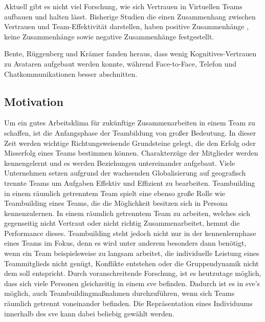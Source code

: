 \documentclass[a4paper,11pt]{article}%
\renewcommand{\\}{\vspace*{0.5\baselineskip} \newline}
\begin{document}
	Aktuell gibt es nicht viel Forschung, wie sich Vertrauen in Virtuellen Teams aufbauen und halten lässt. \citep[p.8-23]{duarte2006mastering} 
Bisherige Studien die einen Zusammenhang zwischen Vertrauen und Team-Effektivität darstellen, haben positive Zusammenhänge \citep{davis2000trusted}, keine Zusammenhänge \citep{hertel2004managing} sowie negative Zusammenhänge \citep{dirks1999effects} festgestellt. \\

Bente, Rüggenberg und Krämer fanden heraus, dass wenig Kognitives-Vertrauen zu Avataren aufgebaut werden konnte, während Face-to-Face, Telefon und Chatkommunikationen besser abschnitten. \citep[p.54-59]{bente2004social}
	
		\subsection{Motivation}
	Um ein gutes Arbeitsklima für zukünftige Zusammenarbeiten in einem Team zu schaffen, ist die Anfangsphase der Teambildung von großer Bedeutung. In dieser Zeit werden wichtige Richtungsweisende Grundsteine gelegt, die den Erfolg oder Misserfolg eines Teams bestimmen können. Charakterzüge der Mitglieder werden kennengelernt und es werden Beziehungen untereinander aufgebaut. \\	
	Viele Unternehmen setzen aufgrund der wachsenden Globalisierung auf geografisch trennte Teams um Aufgaben Effektiv und Effizient zu bearbeiten. Teambuilding in einem räumlich getrenntem Team spielt eine ebenso große Rolle wie Teambuilding eines Teams, die die Möglichkeit besitzen sich in Persona kennenzulernen. \\
	In einem räumlich getrenntem Team zu arbeiten, welches sich gegenseitig nicht Vertraut oder nicht richtig Zusammenarbeitet, hemmt die Performance dieses. \citep[p. 98-107]{huang1998supporting} \citep[p. 399-417]{turoff1993distributed} \\	
	Teambuilding steht jedoch nicht nur in der kennenlernphase eines Teams im Fokus, denn es wird unter anderem besonders dann benötigt, wenn ein Team beispielsweise zu langsam arbeitet, die individuelle Leistung eines Teammitglieds nicht genügt, Konflikte entstehen oder die Gruppendynamik nicht dem soll entspricht. \citep[p. 1-3]{biech2007pfeiffer}\\
	Durch voranschreitende Forschung, ist es heutzutage möglich, dass sich viele Personen gleichzeitig in einem \glqq \ac{sve} \grqq befinden. Dadurch ist es in \ac{sve}'s möglich, auch Teambuildingmaßnahmen durchzuführen, wenn sich Teams räumlich getrennt voneinander befinden.\\
	Die Repräsentation eines Individuums innerhalb des \ac{sve} kann dabei beliebig gewählt werden.
	
\end{document}
